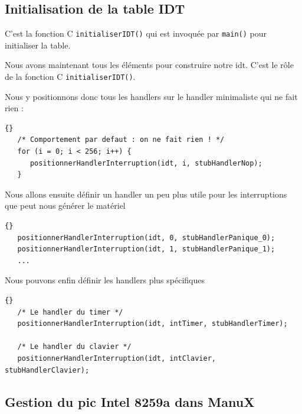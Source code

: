 \begin{itemize}
\subsection{Initialisation de la table IDT}

   C'est la fonction C \lstinline!initialiserIDT()! qui est invoquée
par \lstinline!main()! pour initialiser la table.
   
   Nous avons maintenant tous les éléments pour construire notre {\sc
idt}. C'est le rôle de la fonction C \lstinline!initialiserIDT()!.
   
   Nous y positionnons donc tous les handlers sur le handler minimaliste
qui ne fait rien :

\begin{lstlisting}{}
   /* Comportement par defaut : on ne fait rien ! */
   for (i = 0; i < 256; i++) {
      positionnerHandlerInterruption(idt, i, stubHandlerNop);
   }
\end{lstlisting}

   Nous allons ensuite définir un handler un peu plus utile pour les
interruptions que peut nous générer le matériel

\begin{lstlisting}{}
   positionnerHandlerInterruption(idt, 0, stubHandlerPanique_0);
   positionnerHandlerInterruption(idt, 1, stubHandlerPanique_1);
   ...
\end{lstlisting}
   
   Nous pouvons enfin définir les handlers plus spécifiques

\begin{lstlisting}{}
   /* Le handler du timer */
   positionnerHandlerInterruption(idt, intTimer, stubHandlerTimer);

   /* Le handler du clavier */
   positionnerHandlerInterruption(idt, intClavier, stubHandlerClavier);
\end{lstlisting}

%
\subsection{Gestion du {\sc pic} Intel 8259a dans ManuX}


\end{itemize}
